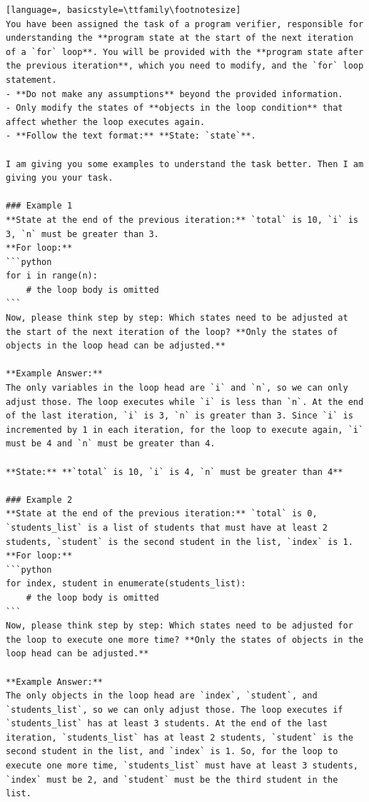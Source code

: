 \documentclass[sigconf]{acmart}
\begin{document}
\begin{tcolorbox}[ colback=gray!10, colframe=black, arc=5pt]
\begin{lstlisting}[language=, basicstyle=\ttfamily\footnotesize]
You have been assigned the task of a program verifier, responsible for understanding the **program state at the start of the next iteration of a `for` loop**. You will be provided with the **program state after the previous iteration**, which you need to modify, and the `for` loop statement.
- **Do not make any assumptions** beyond the provided information.
- Only modify the states of **objects in the loop condition** that affect whether the loop executes again.
- **Follow the text format:** **State: `state`**.

I am giving you some examples to understand the task better. Then I am giving you your task.

### Example 1  
**State at the end of the previous iteration:** `total` is 10, `i` is 3, `n` must be greater than 3.  
**For loop:**  
```python
for i in range(n):
    # the loop body is omitted
```
Now, please think step by step: Which states need to be adjusted at the start of the next iteration of the loop? **Only the states of objects in the loop head can be adjusted.**

**Example Answer:**  
The only variables in the loop head are `i` and `n`, so we can only adjust those. The loop executes while `i` is less than `n`. At the end of the last iteration, `i` is 3, `n` is greater than 3. Since `i` is incremented by 1 in each iteration, for the loop to execute again, `i` must be 4 and `n` must be greater than 4.

**State:** **`total` is 10, `i` is 4, `n` must be greater than 4**

### Example 2  
**State at the end of the previous iteration:** `total` is 0, `students_list` is a list of students that must have at least 2 students, `student` is the second student in the list, `index` is 1.  
**For loop:**  
```python
for index, student in enumerate(students_list):
    # the loop body is omitted
```
Now, please think step by step: Which states need to be adjusted for the loop to execute one more time? **Only the states of objects in the loop head can be adjusted.**

**Example Answer:**  
The only objects in the loop head are `index`, `student`, and `students_list`, so we can only adjust those. The loop executes if `students_list` has at least 3 students. At the end of the last iteration, `students_list` has at least 2 students, `student` is the second student in the list, and `index` is 1. So, for the loop to execute one more time, `students_list` must have at least 3 students, `index` must be 2, and `student` must be the third student in the list.


\end{lstlisting}
\end{tcolorbox}
\end{document}
